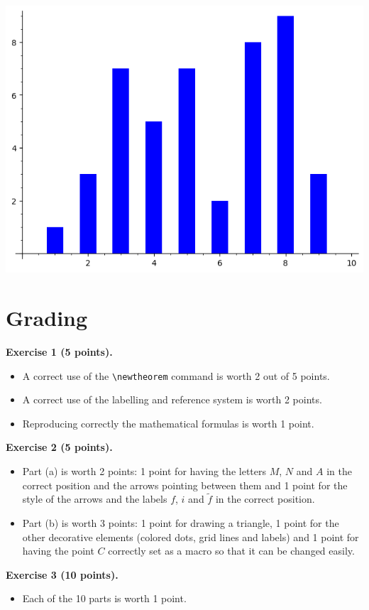 \documentclass[12pt,a4paper]{article}
\theoremstyle{definition}
\theoremstyle{definition}
\begin{document}
\begin{enumerate}[label=(\arabic*)]
\begin{center}
	      \includegraphics[scale=0.5]{bc.png}
	      \end{center}
\end{enumerate}

\newpage
\section*{Grading}

\vspace{0.3cm}
\textbf{Exercise 1 (5 points).}
\begin{itemize}
  \item A correct use of the \texttt{\textbackslash newtheorem} command is
        worth 2 out of 5 points.
  \item A correct use of the labelling and reference system is worth 2 points.
  \item Reproducing correctly the mathematical formulas is worth 1 point.
\end{itemize}

\vspace{0.3cm}
\textbf{Exercise 2 (5 points).}
\begin{itemize}
	\item Part (a) is worth 2 points: 1 point for having the letters
	      $M$, $N$ and $A$ in the correct position and the arrows
	      pointing between them and 1 point for the style of the arrows
	      and the labels $f$, $i$ and $\tilde f$ in the correct position.
	\item Part (b) is worth 3 points: 1 point for drawing a triangle, 1
	      point for the other decorative elements (colored dots, grid lines
	      and labels) and 1 point for having the point $C$ correctly set
	      as a macro so that it can be changed easily.
\end{itemize}

\vspace{0.3cm}
\textbf{Exercise 3 (10 points).}
\begin{itemize}
	\item Each of the 10 parts is worth 1 point.
\end{itemize}
\end{document}
